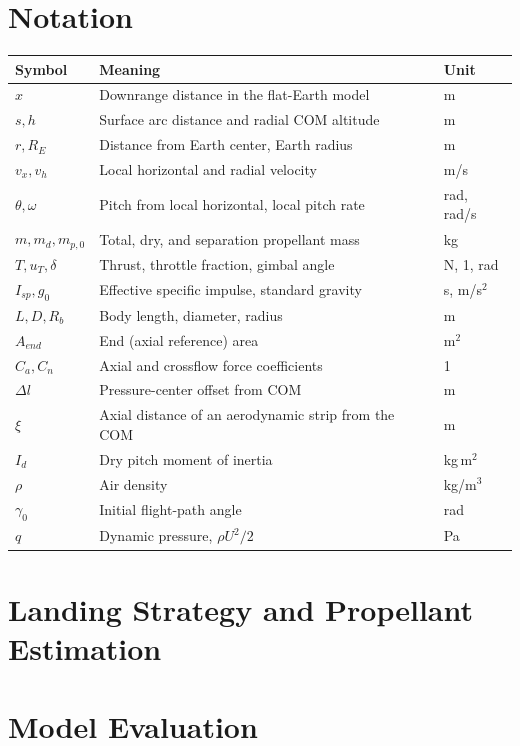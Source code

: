 \documentclass[12pt,a4paper]{article}
\begin{document}
\section{Notation}
\begin{center}
\begin{tabular}{lll}
\toprule
Symbol & Meaning & Unit \\
\midrule
$x$ & Downrange distance in the flat-Earth model & m \\
$s,h$ & Surface arc distance and radial COM altitude & m \\
$r,R_E$ & Distance from Earth center, Earth radius & m \\
$v_x,v_h$ & Local horizontal and radial velocity & m/s \\
$\theta,\omega$ & Pitch from local horizontal, local pitch rate & rad, rad/s \\
$m,m_d,m_{p,0}$ & Total, dry, and separation propellant mass & kg \\
$T,u_T,\delta$ & Thrust, throttle fraction, gimbal angle & N, 1, rad \\
$I_{sp},g_0$ & Effective specific impulse, standard gravity & s, m/s$^2$ \\
$L,D,R_b$ & Body length, diameter, radius & m \\
$A_{end}$ & End (axial reference) area & m$^2$ \\
$C_a,C_n$ & Axial and crossflow force coefficients & 1 \\
$\Delta l$ & Pressure-center offset from COM & m \\
$\xi$ & Axial distance of an aerodynamic strip from the COM & m \\
$I_d$ & Dry pitch moment of inertia & kg\,m$^2$ \\
$\rho$ & Air density & kg/m$^3$ \\
$\gamma_0$ & Initial flight-path angle & rad \\
$q$ & Dynamic pressure, $\rho U^2/2$ & Pa \\
\bottomrule
\end{tabular}
\end{center}

\section{Landing Strategy and Propellant Estimation}
\label{sec:strategy}




\section{Model Evaluation}

\end{document}
